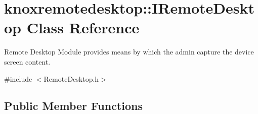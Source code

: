 \hypertarget{classknoxremotedesktop_1_1IRemoteDesktop}{\section{knoxremotedesktop\-:\-:\-I\-Remote\-Desktop \-Class \-Reference}
\label{classknoxremotedesktop_1_1IRemoteDesktop}
}


\-Remote \-Desktop \-Module provides means by which the admin capture the device screen content.  




{\ttfamily \#include $<$\-Remote\-Desktop.\-h$>$}

\subsection*{\-Public \-Member \-Functions}
